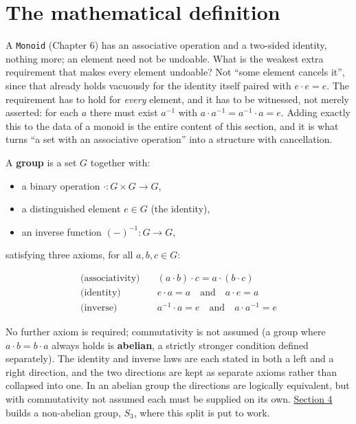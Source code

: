 \section{The mathematical definition}\label{sec:07-groups:01-definition:1}

A \texttt{Monoid} (Chapter 6) has an associative operation and a two-sided identity, nothing more; an element need not be undoable. What is the weakest extra requirement that makes every element undoable? Not ``some element cancels it'', since that already holds vacuously for the identity itself paired with \(e \cdot e = e\). The requirement has to hold for \emph{every} element, and it has to be witnessed, not merely asserted: for each \(a\) there must exist \(a^{-1}\) with \(a \cdot a^{-1} = a^{-1} \cdot a =
e\). Adding exactly this to the data of a monoid is the entire content of this section, and it is what turns ``a set with an associative operation'' into a structure with cancellation.

A \textbf{group} is a set \(G\) together with:

\begin{itemize}
\tightlist
\item
  a binary operation \(\cdot : G \times G \to G\),
\item
  a distinguished element \(e \in G\) (the identity),
\item
  an inverse function \((-)^{-1} : G \to G\),
\end{itemize}

satisfying three axioms, for all \(a, b, c \in G\):

\[
\begin{aligned}
\text{(associativity)} &\quad (a \cdot b) \cdot c = a \cdot (b \cdot c) \\
\text{(identity)} &\quad e \cdot a = a \quad\text{and}\quad a \cdot e = a \\
\text{(inverse)} &\quad a^{-1} \cdot a = e \quad\text{and}\quad a \cdot a^{-1} = e
\end{aligned}
\]

No further axiom is required; commutativity is not assumed (a group where \(a \cdot b = b \cdot a\) always holds is \textbf{abelian}, a strictly stronger condition defined separately). The identity and inverse laws are each stated in both a left and a right direction, and the two directions are kept as separate axioms rather than collapsed into one. In an abelian group the directions are logically equivalent, but with commutativity not assumed each must be supplied on its own. \hyperref[sec:07-groups:04-permutations-example:1]{Section 4} builds a non-abelian group, \(S_3\), where this split is put to work.

